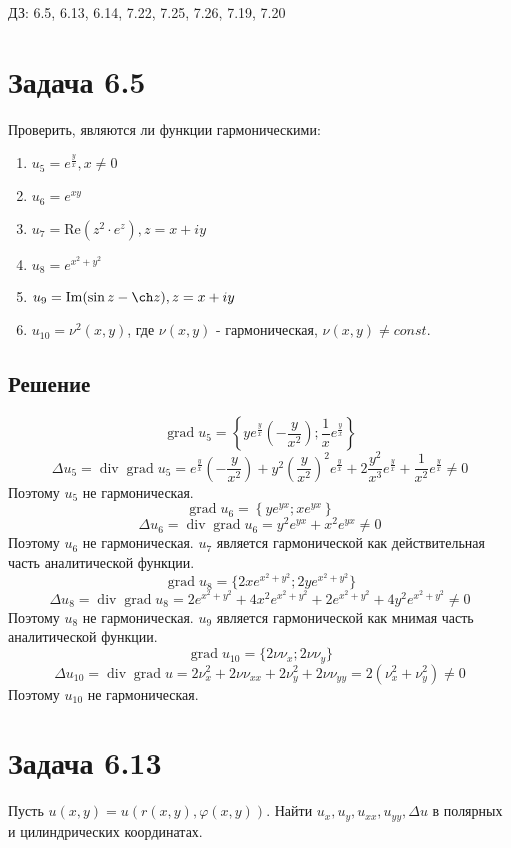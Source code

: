 \documentclass[11pt]{article}
\author{Sergey Makarov}
\date{\today}
\title{}
\def\zall{\setcounter{lem}{0}\setcounter{cnsqnc}{0}\setcounter{th}{0}\setcounter{Cmt}{0}\setcounter{equation}{0}}
\newcounter{lem}\setcounter{lem}{0}
\newcounter{th}\setcounter{th}{0}
\newcounter{cnsqnc}\setcounter{cnsqnc}{0}
\newcounter{Cmt}\setcounter{Cmt}{0}
\renewcommand{\div}{\operatorname{div}}
\newcommand{\grad}{\operatorname{grad}}
\begin{document}
\zall

ДЗ: 6.5, 6.13, 6.14, 7.22, 7.25, 7.26, 7.19, 7.20
\section{Задача 6.5}
\label{sec:org681e265}
Проверить, являются ли функции гармоническими:
\begin{enumerate}
\item \(u_5 = e^{\frac{y}x}, x \neq 0\)
\item \(u_6 = e^{xy}\)
\item \(u_7 = \mathrm{Re}(z^2\cdot e^z), z = x + iy\)
\item \(u_8 = e^{x^2 + y^2}\)
\item \(u_9 = \mathrm{Im}(\sin z - \ch z), z = x + iy\)
\item \(u_{10} = \nu^2(x, y)\), где \(\nu(x, y)\) - гармоническая, \(\nu(x, y) \neq const\).
\end{enumerate}
\subsection{Решение}
\label{sec:orged40c99}
$$\grad u_5 = \left\{ye^{\frac{y}x}\left(-\frac{y}{x^2}\right); \frac1xe^{\frac{y}x}\right\}$$
$$\Delta u_5 = \div\grad u_5 = e^{\frac{y}x}\left(-\frac{y}{x^2}\right) + y^2\left(\frac{y}{x^2}\right)^2e^{\frac{y}x} + 2\frac{y^2}{x^3}e^{\frac{y}x} + \frac1{x^2}e^{\frac{y}x} \neq 0$$
Поэтому $u_5$ не гармоническая.
$$\grad u_6 = \left\{ye^{yx}; xe^{yx}\right\}$$
$$\Delta u_6 = \div\grad u_6 = y^2e^{yx} + x^2e^{yx} \neq 0$$
Поэтому $u_6$ не гармоническая.
$u_7$ является гармонической как действительная часть аналитической функции.
$$\grad u_8 = \{2xe^{x^2 + y^2}; 2ye^{x^2 + y^2}\}$$
$$\Delta u_8 = \div\grad u_8 = 2e^{x^2 + y^2} + 4x^2e^{x^2 + y^2} + 2e^{x^2 + y^2} + 4y^2e^{x^2 + y^2} \neq 0$$
Поэтому $u_8$ не гармоническая.
$u_9$ является гармонической как мнимая часть аналитической функции.
$$\grad u_{10} = \{2\nu\nu_x; 2\nu\nu_y\}$$
$$\Delta u_{10} = \div\grad u = 2\nu_x^2 + 2\nu\nu_{xx} + 2\nu_y^2 + 2\nu\nu_{yy} = 2(\nu_x^2 + \nu_y^2) \neq 0$$
Поэтому $u_{10}$ не гармоническая.
\section{Задача 6.13}
\label{sec:orgd82a5eb}
Пусть $u(x, y) = u(r(x, y), \varphi(x, y))$. Найти $u_x, u_y, u_{xx}, u_{yy}, \Delta u$ в
полярных и цилиндрических координатах.
\end{document}
